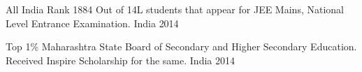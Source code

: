 



\begin{cvhonors}
\cvhonor
    {All India Rank 1884} %
    {Out of 14L students that appear for JEE Mains, National Level Entrance Examination.} %
    {India} %
    {2014} %

  \cvhonor
    {Top 1\%} %
    {Maharashtra State Board of Secondary and Higher Secondary Education. Received Inspire Scholarship for the same.} %
    {India} %
    {2014} %

\end{cvhonors}
